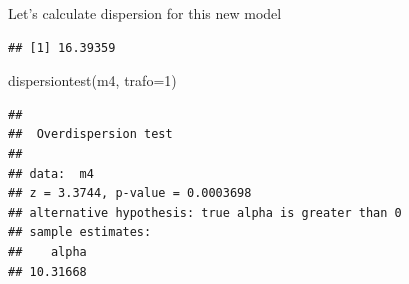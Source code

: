 \documentclass[
  ignorenonframetext,
]{beamer}
\newenvironment{Shaded}{\begin{snugshade}}{\end{snugshade}}
\newcommand{\AttributeTok}[1]{\textcolor[rgb]{0.77,0.63,0.00}{#1}}
\newcommand{\DecValTok}[1]{\textcolor[rgb]{0.00,0.00,0.81}{#1}}
\newcommand{\DocumentationTok}[1]{\textcolor[rgb]{0.56,0.35,0.01}{\textbf{\textit{#1}}}}
\newcommand{\FunctionTok}[1]{\textcolor[rgb]{0.00,0.00,0.00}{#1}}
\newcommand{\NormalTok}[1]{#1}
\newcommand{\OtherTok}[1]{\textcolor[rgb]{0.56,0.35,0.01}{#1}}
\newcommand{\SpecialCharTok}[1]{\textcolor[rgb]{0.00,0.00,0.00}{#1}}
\newcommand{\StringTok}[1]{\textcolor[rgb]{0.31,0.60,0.02}{#1}}
\begin{document}
\begin{frame}[fragile]{}
\protect\hypertarget{section-14}{}
Let's calculate dispersion for this new model

\vspace{12pt}
\tiny

\begin{Shaded}
\end{Shaded}

\begin{verbatim}
## [1] 16.39359
\end{verbatim}

\begin{Shaded}
\begin{Highlighting}[]
\FunctionTok{dispersiontest}\NormalTok{(m4, }\AttributeTok{trafo=}\DecValTok{1}\NormalTok{)}
\end{Highlighting}
\end{Shaded}

\begin{verbatim}
## 
##  Overdispersion test
## 
## data:  m4
## z = 3.3744, p-value = 0.0003698
## alternative hypothesis: true alpha is greater than 0
## sample estimates:
##    alpha 
## 10.31668
\end{verbatim}
\end{frame}
\end{document}
